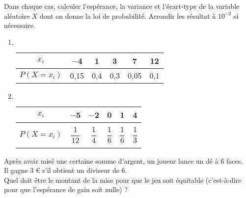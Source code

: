 \documentclass[a4paper,11pt,exos]{nsi} %
\begin{document}
\exo{}
Dans chaque cas, calculer l'espérance, la variance et l'écart-type de la variable aléatoire $X$ dont on donne la loi de probabilité. Arrondir les résultat à $10^{-2}$ si nécessaire.
\begin{multicols}{2}
	\begin{enumerate}
		\item 	 $\quad$\\
		\begin{tabular}{|c|c|c|c|c|c|}
			\hline
			\cellcolor{UGLiOrange} $x_i$ & $-$4 & 1 & 3 & 7 & 12\\
			\hline
			\cellcolor{UGLiOrange} $P(X=x_i)$ & 0,15 & 0,4 & 0,3 & 0,05 & 0,1\\
			\hline
		\end{tabular}
	\vspace{2cm}
		\item 	$\quad$\\
		\begin{tabular}{|c|c|c|c|c|c|}
			\hline
			\cellcolor{UGLiOrange} $x_i$ & $-$5 & $-$2 & 0 & 1 & 4\\
			\hline
			\cellcolor{UGLiOrange} & & & & & \\
			 \cellcolor{UGLiOrange} $P(X=x_i)$ & $\dfrac{1}{12}$ & $\dfrac{1}{4}$ & $\dfrac{1}{6}$ & $\dfrac{1}{6}$ & $\dfrac{1}{3}$\\
			 \cellcolor{UGLiOrange} & & & & & \\
			\hline
		\end{tabular}
	\end{enumerate}
\end{multicols}


\exo{}
Après avoir misé une certaine somme d'argent, un joueur lance un dé à 6 faces.\\
Il gagne 3 € s'il obtient un diviseur de 6.\\[0.5em]
Quel doit être le montant de la mise pour que le jeu soit équitable (c'est-à-dire pour que l'espérance de gain soit nulle) ?
\end{document}
